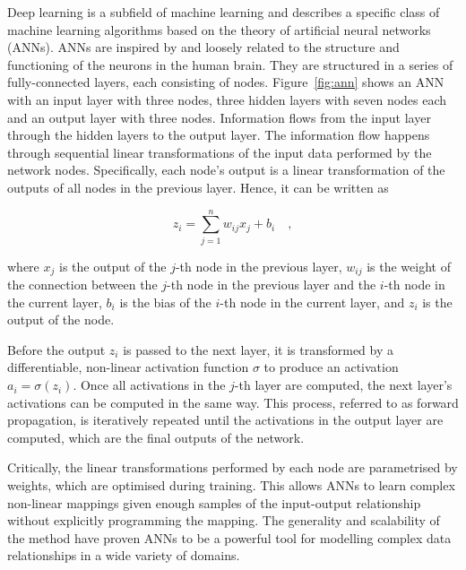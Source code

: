\documentclass[a4paper]{article}
\begin{document}
Deep learning is a subfield of machine learning and describes a specific class
of machine learning algorithms based on the theory of artificial neural networks
(ANNs). ANNs are inspired by and loosely related to the structure and
functioning of the neurons in the human brain. They are structured in a series
of fully-connected layers, each consisting of nodes. Figure~\ref{fig:ann} shows
an ANN with an input layer with three nodes, three hidden layers with seven
nodes each and an output layer with three nodes. Information flows from the
input layer through the hidden layers to the output layer. The information flow
happens through sequential linear transformations of the input data performed by
the network nodes. Specifically, each node's output is a linear transformation
of the outputs of all nodes in the previous layer. Hence, it can be written as

\begin{equation}
  z_{i} = \sum_{j=1}^{n} w_{ij} x_j + b_i \quad ,
  \label{eq:perceptron}
\end{equation}

where $x_j$ is the output of the $j$-th node in the previous layer, $w_{ij}$ is
the weight of the connection between the $j$-th node in the previous layer and
the $i$-th node in the current layer, $b_i$ is the bias of the $i$-th node in
the current layer, and $z_i$ is the output of the node.

Before the output $z_i$ is passed to the next layer, it is transformed by a
differentiable, non-linear activation function $\sigma$ to produce an activation
$a_i = \sigma(z_i)$. Once all activations in the $j$-th layer are computed, the
next layer's activations can be computed in the same way. This process, referred
to as forward propagation, is iteratively repeated until the activations in the
output layer are computed, which are the final outputs of the network.

Critically, the linear transformations performed by each node are parametrised
by weights, which are optimised during training. This allows ANNs to learn
complex non-linear mappings given enough samples of the input-output
relationship without explicitly programming the mapping. The generality and
scalability of the method have proven ANNs to be a powerful tool for modelling
complex data relationships in a wide variety of domains.
\end{document}
